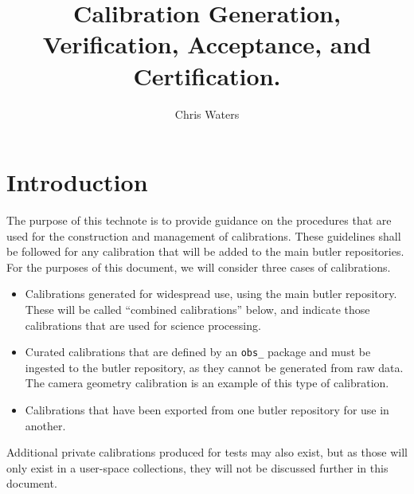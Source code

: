 \documentclass[DM,authoryear,toc]{lsstdoc}
\title{Calibration Generation, Verification, Acceptance, and Certification.}
\author{%
Chris Waters
}
\date{\vcsDate}
\begin{document}
\maketitle


\section{Introduction}

The purpose of this technote is to provide guidance on the procedures that are used for the construction and management of calibrations.  These guidelines shall be followed for any calibration that will be added to the main butler repositories.  For the purposes of this document, we will consider three cases of calibrations.

\begin{itemize}
\item Calibrations generated for widespread use, using the main butler repository.  These will be called ``combined calibrations'' below, and indicate those calibrations that are used for science processing.
\item Curated calibrations that are defined by an \verb|obs_| package and must be ingested to the butler repository, as they cannot be generated from raw data.  The camera geometry calibration is an example of this type of calibration.
\item Calibrations that have been exported from one butler repository for use in another.
\end{itemize}

Additional private calibrations produced for tests may also exist, but as those will only exist in a user-space collections, they will not be discussed further in this document.
\end{document}
